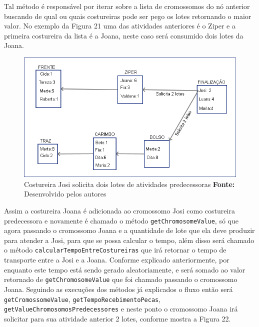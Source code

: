 \par Tal método é responsável por iterar sobre a lista de cromossomos do nó anterior buscando de qual ou quais costureiras pode ser
pego os lotes retornando o maior valor. No exemplo da Figura 21 uma das atividades anteriores é o Ziper e a
primeira costureira da lista é a Joana, neste caso será consumido dois lotes da Joana.

\newpage

\begin{figure}[h!]
	\centerline{\includegraphics[scale=0.6]{./imagens/processo_solciitacao_de_lotes1.png}}
	\caption[Distribuição de trabalho]
	{Costureira Josi solicita dois lotes de atividades predecessoras \textbf{Fonte:} Desenvolvido pelos autores}
	\label{fig:exemplo1}
\end{figure}


\par Assim a costureira Joana é adicionada ao cromossomo Josi como costureira predecessora e novamente é 
chamado o método \texttt{getChromosomeValue}, só que agora passando o cromossomo Joana e a quantidade
de lote que ela deve produzir para atender a Josi, para que se possa calcular o tempo, além disso será chamado o método 
\texttt{calcularTempoEntreCostureiras} que irá retornar o tempo de transporte entre a Josi e a Joana. Conforme explicado
anteriormente, por enquanto este tempo está sendo gerado aleatoriamente, e será somado ao valor retornado de \texttt{getChromosomeValue}
que  foi chamado passando o cromossomo Joana. Seguindo as execuções dos métodos já explicados o fluxo então será \texttt{getCromossomeValue}, \texttt{getTempoRecebimentoPecas}, \texttt{getValueChromosomosPredecessores} e neste ponto o cromossomo Joana irá solicitar para sua atividade anterior 2 lotes, conforme mostra a Figura 22.



